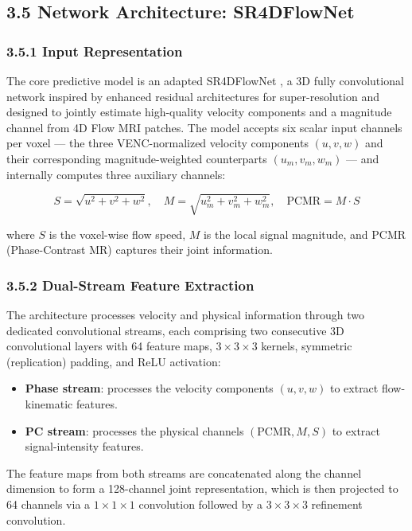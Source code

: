 \subsection*{3.5 Network Architecture: SR4DFlowNet}

\subsubsection*{3.5.1 Input Representation}

The core predictive model is an adapted SR4DFlowNet \cite{ferdian2020,elahmar2023}, a 3D fully convolutional network inspired by enhanced residual architectures for super-resolution \cite{lim2017edsr} and designed to jointly estimate high-quality velocity components and a magnitude channel from 4D Flow MRI patches. The model accepts six scalar input channels per voxel --- the three VENC-normalized velocity components $(u, v, w)$ and their corresponding magnitude-weighted counterparts $(u_m, v_m, w_m)$ --- and internally computes three auxiliary channels:

\begin{equation}
    S = \sqrt{u^2 + v^2 + w^2}, \quad
    M = \sqrt{u_m^2 + v_m^2 + w_m^2}, \quad
    \text{PCMR} = M \cdot S
\end{equation}

where $S$ is the voxel-wise flow speed, $M$ is the local signal magnitude, and PCMR (Phase-Contrast MR) captures their joint information.

\subsubsection*{3.5.2 Dual-Stream Feature Extraction}

The architecture processes velocity and physical information through two dedicated convolutional streams, each comprising two consecutive 3D convolutional layers with 64 feature maps, $3\times3\times3$ kernels, symmetric (replication) padding, and ReLU activation:

\begin{itemize}
    \item \textbf{Phase stream}: processes the velocity components $(u, v, w)$ to extract flow-kinematic features.
    \item \textbf{PC stream}: processes the physical channels $(\text{PCMR}, M, S)$ to extract signal-intensity features.
\end{itemize}

The feature maps from both streams are concatenated along the channel dimension to form a 128-channel joint representation, which is then projected to 64 channels via a $1\times1\times1$ convolution followed by a $3\times3\times3$ refinement convolution.

